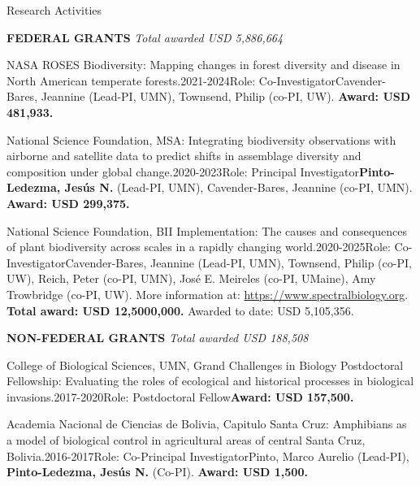 \documentclass{resume} %
\begin{document}
\begin{rSection}{Research Activities}

\textbf{FEDERAL GRANTS } \hfill {\em Total awarded USD 5,886,664}

\begin{pSubsection}{NASA ROSES Biodiversity: }{Mapping changes in forest diversity and disease in North American temperate forests.}{2021-2024}{Role: Co-Investigator}{Cavender-Bares, Jeannine (Lead-PI, UMN), Townsend, Philip (co-PI, UW). {\bf Award: USD 481,933.}}
\end{pSubsection}

\begin{pSubsection}{National Science Foundation, MSA: }{Integrating biodiversity observations with airborne and satellite data to predict shifts in assemblage diversity and composition under global change.}{2020-2023}{Role: Principal Investigator}{}{{\bf Pinto-Ledezma, Jesús N.} (Lead-PI, UMN), Cavender-Bares, Jeannine (co-PI, UMN). {\bf Award: USD 299,375.}}
\end{pSubsection}

\begin{pSubsection}{National Science Foundation, BII Implementation: }{The causes and consequences of plant biodiversity across scales in a rapidly changing world.}{2020-2025}{Role: Co-Investigator}{Cavender-Bares, Jeannine (Lead-PI, UMN), Townsend, Philip (co-PI, UW), Reich, Peter (co-PI, UMN), José E. Meireles (co-PI, UMaine), Amy Trowbridge (co-PI, UW). More information at: \url{https://www.spectralbiology.org}. {\bf Total award: USD 12,5000,000.} Awarded to date: USD 5,105,356.}
\end{pSubsection}

\textbf{NON-FEDERAL GRANTS }  \hfill {\em Total awarded USD 188,508}

\begin{pSubsection}{College of Biological Sciences, UMN, Grand Challenges in Biology Postdoctoral Fellowship: }{Evaluating the roles of ecological and historical processes in biological invasions.}{2017-2020}{Role: Postdoctoral Fellow}{{\bf Award: USD 157,500.}}
\end{pSubsection}

\begin{pSubsection}{Academia Nacional de Ciencias de Bolivia, Capitulo Santa Cruz: }{Amphibians as a model of biological control in agricultural areas of central Santa Cruz, Bolivia.}{2016-2017}{Role: Co-Principal Investigator}{Pinto, Marco Aurelio (Lead-PI), \textbf{Pinto-Ledezma, Jesús N.} (Co-PI). {\bf Award: USD 1,500.}}
\end{pSubsection}


\end{rSection}
\end{document}
